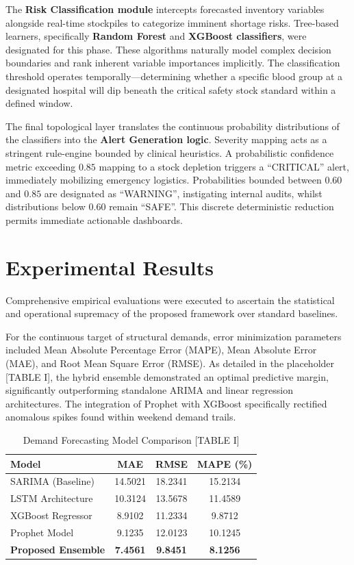 \documentclass[conference]{IEEEtran}
\begin{document}
The \textbf{Risk Classification module} intercepts forecasted inventory variables alongside real-time stockpiles to categorize imminent shortage risks. Tree-based learners, specifically \textbf{Random Forest} and \textbf{XGBoost classifiers}, were designated for this phase. These algorithms naturally model complex decision boundaries and rank inherent variable importances implicitly. The classification threshold operates temporally—determining whether a specific blood group at a designated hospital will dip beneath the critical safety stock standard within a defined window.

The final topological layer translates the continuous probability distributions of the classifiers into the \textbf{Alert Generation logic}. Severity mapping acts as a stringent rule-engine bounded by clinical heuristics. A probabilistic confidence metric exceeding $0.85$ mapping to a stock depletion triggers a ``CRITICAL'' alert, immediately mobilizing emergency logistics. Probabilities bounded between $0.60$ and $0.85$ are designated as ``WARNING'', instigating internal audits, whilst distributions below $0.60$ remain ``SAFE''. This discrete deterministic reduction permits immediate actionable dashboards.

\section{Experimental Results}
Comprehensive empirical evaluations were executed to ascertain the statistical and operational supremacy of the proposed framework over standard baselines. 

For the continuous target of structural demands, error minimization parameters included Mean Absolute Percentage Error (MAPE), Mean Absolute Error (MAE), and Root Mean Square Error (RMSE). As detailed in the placeholder [TABLE I], the hybrid ensemble demonstrated an optimal predictive margin, significantly outperforming standalone ARIMA and linear regression architectures. The integration of Prophet with XGBoost specifically rectified anomalous spikes found within weekend demand trails.

\begin{table}[htbp]
\caption{Demand Forecasting Model Comparison [TABLE I]}
\begin{center}
\begin{tabular}{lccc}
\toprule
\textbf{Model} & \textbf{MAE} & \textbf{RMSE} & \textbf{MAPE (\%)} \\
\midrule
SARIMA (Baseline)  & 14.5021 & 18.2341 & 15.2134 \\
LSTM Architecture & 10.3124 & 13.5678 & 11.4589 \\
XGBoost Regressor & 8.9102  & 11.2334 & 9.8712 \\
Prophet Model      & 9.1235  & 12.0123 & 10.1245 \\
\textbf{Proposed Ensemble} & \textbf{7.4561} & \textbf{9.8451} & \textbf{8.1256} \\
\bottomrule
\end{tabular}
\label{tab:demand}
\end{center}
\end{table}
\end{document}
